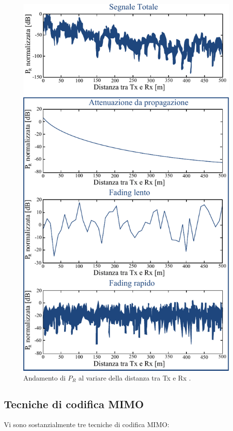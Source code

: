 \documentclass[technote]{IEEEtran}
\begin{document}
\begin{figure}[!h]
\centering
\includegraphics[width=.8\columnwidth]{figure8}
\caption{Andamento di $P_R$ al variare della distanza tra Tx e Rx \cite{DeFlavis}.}
\label{fig:8}
\end{figure}

\subsection{Tecniche di codifica MIMO}

\par Vi sono sostanzialmente tre tecniche di codifica MIMO:
\end{document}
